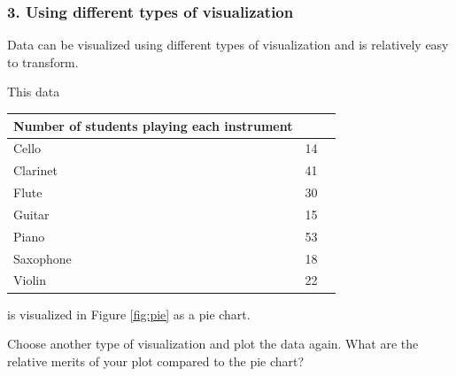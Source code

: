 \subsubsection*{3. Using different types of visualization}

Data can be visualized using different types of visualization and is relatively easy to transform.

\begin{problem}
This data

\begin{tabular}{ | l || l | l | }
\hline
Number of students playing each instrument  & \\
\hline
Cello & 14 \\
Clarinet & 41 \\
Flute & 30 \\
Guitar & 15 \\
Piano & 53 \\
Saxophone & 18 \\
Violin & 22 \\
\hline
\end{tabular}

 is visualized in Figure \ref{fig:pie} as a pie chart.

Choose another type of visualization and plot the data again. What are the relative merits of your plot compared to the pie chart?

\end{problem}


